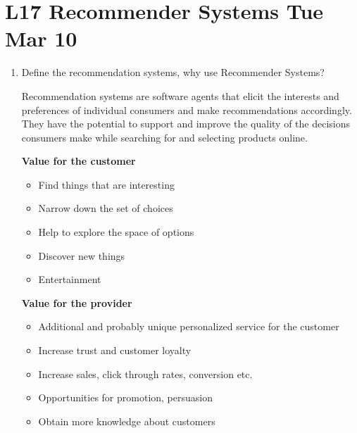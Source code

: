 \documentclass[12pt]{article}
\newenvironment{QandA}{\begin{enumerate}[label=\bfseries\arabic*.]\bfseries}
{\end{enumerate}}
\newenvironment{answered}{\par\normalfont\color{Sepia}}{}
\begin{document}
\section*{L17 Recommender Systems \textemdash{} Tue Mar 10}
\begin{QandA}

    \item Define the recommendation systems, why use Recommender Systems?
    \begin{answered}
        Recommendation systems are software agents that elicit the interests
        and preferences of individual consumers and make recommendations accordingly.
        They have the potential to support and improve the quality of the decisions
        consumers make while searching for and selecting products online.

        \textbf{Value for the customer}
        \begin{itemize}
            \item Find things that are interesting
            \item Narrow down the set of choices
            \item Help to explore the space of options
            \item Discover new things
            \item Entertainment
        \end{itemize}
        \textbf{Value for the provider}
        \begin{itemize}
            \item Additional and probably unique personalized service for the customer
            \item Increase trust and customer loyalty
            \item Increase sales, click through rates, conversion etc.
            \item Opportunities for promotion, persuasion
            \item Obtain more knowledge about customers
        \end{itemize}
    \end{answered}


\end{QandA}
\end{document}
